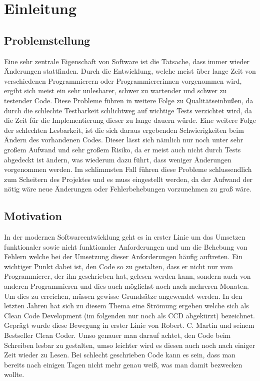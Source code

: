 \chapter{Einleitung}
\label{cha:Einleitung}

\section{Problemstellung}
Eine sehr zentrale Eigenschaft von Software ist die Tatsache, dass immer wieder Änderungen stattfinden. Durch die Entwicklung, welche meist über lange Zeit von verschiedenen Programmierern oder Programmiererinnen vorgenommen wird, ergibt sich meist ein sehr unlesbarer, schwer zu wartender und schwer zu testender Code.
Diese Probleme führen in weitere Folge zu Qualitätseinbußen, da durch die schlechte Testbarkeit schlichtweg auf wichtige Tests verzichtet wird, da die Zeit für
die Implementierung dieser zu lange dauern würde. Eine weitere Folge der schlechten Lesbarkeit, ist die sich daraus ergebenden Schwierigkeiten beim Ändern des vorhandenen Codes. Dieser lässt sich nämlich nur noch unter sehr großem Aufwand und sehr großem Risiko, da er meist auch nicht durch Tests abgedeckt ist ändern,
was wiederum dazu führt, dass weniger Änderungen vorgenommen werden. Im schlimmsten Fall führen diese Probleme schlussendlich zum Scheitern des Projektes und es 
muss eingestellt werden, da der Aufwand der nötig wäre neue Änderungen oder Fehlerbehebungen vorzunehmen zu groß wäre. 

\section{Motivation}
In der modernen Softwareentwicklung geht es in erster Linie um das Umsetzen funktionaler sowie nicht funktionaler
Anforderungen und um die Behebung von Fehlern welche bei der Umsetzung dieser Anforderungen häufig auftreten. Ein wichtiger Punkt dabei ist, den Code so zu gestalten, dass er nicht nur vom Programmierer, der ihn geschrieben hat, gelesen werden kann, sondern auch von anderen Programmieren und dies auch möglichst noch nach mehreren Monaten. Um dies zu erreichen, müssen gewisse Grundsätze angewendet werden. In den letzten Jahren hat sich zu diesem Thema eine Strömung ergeben welche sich als Clean Code Development (im folgenden nur noch als CCD abgekürzt) bezeichnet. Geprägt wurde diese Bewegung in erster Linie von Robert. C. Martin und seinem Bestseller Clean Coder. Umso genauer man darauf achtet, den Code beim Schreiben lesbar zu gestalten, umso leichter wird es diesen auch noch nach einiger Zeit wieder zu Lesen. Bei schlecht geschrieben Code kann es sein, dass man bereits nach einigen Tagen nicht mehr genau weiß, was man damit bezwecken wollte. 


